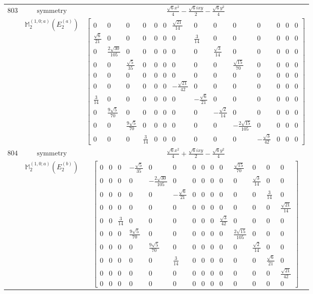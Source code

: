 \documentclass[fleqn,8pt,landscape]{jsarticle}
\begin{document}
\begin{longtable}{ccc}
$ 803 $ & $ \text{symmetry} $ & $ \frac{\sqrt{6} x^{2}}{4} - \frac{\sqrt{6} i x y}{2} - \frac{\sqrt{6} y^{2}}{4} $ \\
$  $ & $ \mathbb{M}_{2}^{(1,0;a)}(E_{2}^{(a)}) $ & $ \begin{bmatrix} 0 & 0 & 0 & 0 & 0 & 0 & \frac{\sqrt{21}}{14} & 0 & 0 & 0 & 0 & 0 & 0 & 0 \\ \frac{\sqrt{6}}{21} & 0 & 0 & 0 & 0 & 0 & 0 & \frac{3}{14} & 0 & 0 & 0 & 0 & 0 & 0 \\ 0 & \frac{2 \sqrt{30}}{105} & 0 & 0 & 0 & 0 & 0 & 0 & \frac{\sqrt{3}}{14} & 0 & 0 & 0 & 0 & 0 \\ 0 & 0 & \frac{\sqrt{5}}{35} & 0 & 0 & 0 & 0 & 0 & 0 & \frac{\sqrt{15}}{70} & 0 & 0 & 0 & 0 \\ 0 & 0 & 0 & 0 & 0 & 0 & 0 & 0 & 0 & 0 & 0 & 0 & 0 & 0 \\ 0 & 0 & 0 & 0 & 0 & 0 & - \frac{\sqrt{21}}{42} & 0 & 0 & 0 & 0 & 0 & 0 & 0 \\ \frac{3}{14} & 0 & 0 & 0 & 0 & 0 & 0 & - \frac{\sqrt{6}}{21} & 0 & 0 & 0 & 0 & 0 & 0 \\ 0 & \frac{9 \sqrt{5}}{70} & 0 & 0 & 0 & 0 & 0 & 0 & - \frac{\sqrt{2}}{14} & 0 & 0 & 0 & 0 & 0 \\ 0 & 0 & \frac{9 \sqrt{5}}{70} & 0 & 0 & 0 & 0 & 0 & 0 & - \frac{2 \sqrt{15}}{105} & 0 & 0 & 0 & 0 \\ 0 & 0 & 0 & \frac{3}{14} & 0 & 0 & 0 & 0 & 0 & 0 & - \frac{\sqrt{3}}{42} & 0 & 0 & 0 \end{bmatrix} $ \\ \hline
$ 804 $ & $ \text{symmetry} $ & $ \frac{\sqrt{6} x^{2}}{4} + \frac{\sqrt{6} i x y}{2} - \frac{\sqrt{6} y^{2}}{4} $ \\
$  $ & $ \mathbb{M}_{2}^{(1,0;a)}(E_{2}^{(b)}) $ & $ \begin{bmatrix} 0 & 0 & 0 & - \frac{\sqrt{5}}{35} & 0 & 0 & 0 & 0 & 0 & 0 & \frac{\sqrt{15}}{70} & 0 & 0 & 0 \\ 0 & 0 & 0 & 0 & - \frac{2 \sqrt{30}}{105} & 0 & 0 & 0 & 0 & 0 & 0 & \frac{\sqrt{3}}{14} & 0 & 0 \\ 0 & 0 & 0 & 0 & 0 & - \frac{\sqrt{6}}{21} & 0 & 0 & 0 & 0 & 0 & 0 & \frac{3}{14} & 0 \\ 0 & 0 & 0 & 0 & 0 & 0 & 0 & 0 & 0 & 0 & 0 & 0 & 0 & \frac{\sqrt{21}}{14} \\ 0 & 0 & \frac{3}{14} & 0 & 0 & 0 & 0 & 0 & 0 & \frac{\sqrt{3}}{42} & 0 & 0 & 0 & 0 \\ 0 & 0 & 0 & \frac{9 \sqrt{5}}{70} & 0 & 0 & 0 & 0 & 0 & 0 & \frac{2 \sqrt{15}}{105} & 0 & 0 & 0 \\ 0 & 0 & 0 & 0 & \frac{9 \sqrt{5}}{70} & 0 & 0 & 0 & 0 & 0 & 0 & \frac{\sqrt{2}}{14} & 0 & 0 \\ 0 & 0 & 0 & 0 & 0 & \frac{3}{14} & 0 & 0 & 0 & 0 & 0 & 0 & \frac{\sqrt{6}}{21} & 0 \\ 0 & 0 & 0 & 0 & 0 & 0 & 0 & 0 & 0 & 0 & 0 & 0 & 0 & \frac{\sqrt{21}}{42} \\ 0 & 0 & 0 & 0 & 0 & 0 & 0 & 0 & 0 & 0 & 0 & 0 & 0 & 0 \end{bmatrix} $ \\ \hline

\end{longtable}
\end{document}
